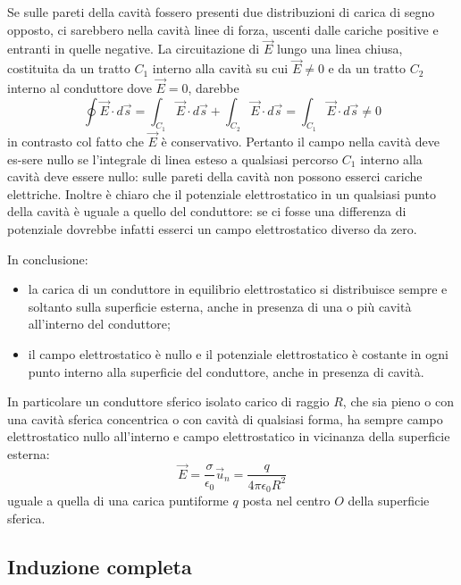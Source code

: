 \documentclass[class=book, crop=false, oneside, 12pt]{standalone}
\begin{document}
Se sulle pareti della cavità fossero presenti due distribuzioni di carica di segno opposto, ci sarebbero nella cavità linee di forza, uscenti dalle cariche positive e entranti in quelle negative. 
La circuitazione di \(\overrightarrow{E}\) lungo una linea chiusa, costituita da un tratto \(C_1\) interno alla cavità su cui \(\overrightarrow{E} \neq 0\) e da un tratto \(C_2\) interno al conduttore dove \(\overrightarrow{E} = 0\), darebbe
\begin{equation*}
    \oint \overrightarrow{E} \cdot d \overrightarrow{s} = \int_{C_1} \overrightarrow{E} \cdot d \overrightarrow{s} + \int_{C_2} \overrightarrow{E} \cdot d \overrightarrow{s} = \int_{C_1} \overrightarrow{E} \cdot d \overrightarrow{s} \neq 0
\end{equation*}
in contrasto col fatto che \(\overrightarrow{E}\) è conservativo. 
Pertanto il campo nella cavità deve es-sere nullo se l'integrale di linea esteso a qualsiasi percorso \(C_1\) interno alla cavità deve essere nullo: sulle pareti della cavità non possono esserci cariche elettriche.
Inoltre è chiaro che il potenziale elettrostatico in un qualsiasi punto della cavità è uguale a quello del conduttore: se ci fosse una differenza di potenziale dovrebbe infatti esserci un campo elettrostatico diverso da zero. 

In conclusione:
\begin{itemize}
    \item la carica di un conduttore in equilibrio elettrostatico si distribuisce sempre e soltanto sulla superficie esterna, anche in presenza di una o più cavità all'interno del conduttore; 
    \item il campo elettrostatico è nullo e il potenziale elettrostatico è costante in ogni punto interno alla superficie del conduttore, anche in presenza di cavità.
\end{itemize}

In particolare un conduttore sferico isolato carico di raggio \(R\), che sia pieno o con una cavità sferica concentrica o con cavità di qualsiasi forma, ha sempre campo elettrostatico nullo all'interno e campo elettrostatico in vicinanza della superficie esterna:
\begin{equation*}
    \overrightarrow{E} = \frac{\sigma}{\epsilon_0} \overrightarrow{u}_n = \frac{q}{4 \pi \epsilon_0 R^2}
\end{equation*}
uguale a quella di una carica puntiforme \(q\) posta nel centro \(O\) della superficie sferica. 

\subsection{Induzione completa}
\end{document}
